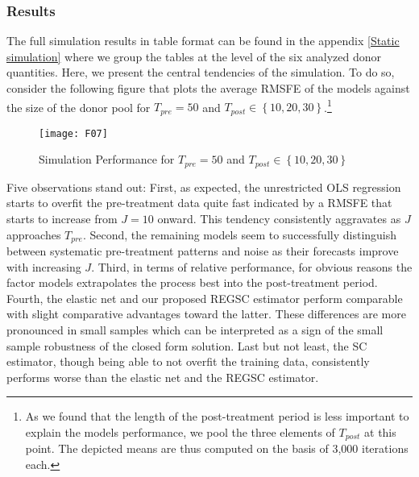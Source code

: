 \subsubsection{Results}
The full simulation results in table format can be found in the appendix \ref{Static simulation} where we group the tables at the level of the six analyzed donor quantities. Here, we present the central tendencies of the simulation. To do so, consider the following figure that plots the average \ac{RMSFE} of the models against the size of the donor pool for $T_{pre} = 50$ and $T_{post} \in \left\lbrace 10,20,30\right\rbrace$.\footnote{As we found that the length of the post-treatment period is less important to explain the models performance, we pool the three elements of $T_{post}$ at this point. The depicted means are thus computed on the basis of 3,000 iterations each.} 



\begin{figure}[H]
	\centering
	\texttt{[image: F07]}
	\caption{Simulation Performance for $T_{pre} = 50$ and $T_{post} \in \left\lbrace 10,20,30\right\rbrace$}
	\label{F_07}
\end{figure}

Five observations stand out: First, as expected, the unrestricted \ac{OLS} regression starts to overfit the pre-treatment data quite fast indicated by a \ac{RMSFE} that starts to increase from $J = 10$ onward. This tendency consistently aggravates as $J$ approaches $T_{pre}$. Second, the remaining models seem to successfully distinguish between systematic pre-treatment patterns and noise as their forecasts improve with increasing $J$. Third, in terms of relative performance, for obvious reasons the factor models extrapolates the process best into the post-treatment period. Fourth, the elastic net and our proposed \ac{REGSC} estimator perform comparable with slight comparative advantages toward the latter. These differences are more pronounced in small samples which can be interpreted as a sign of the small sample robustness of the closed form solution. Last but not least, the \ac{SC} estimator, though being able to not overfit the training data, consistently performs worse than the elastic net and the \ac{REGSC} estimator. 

